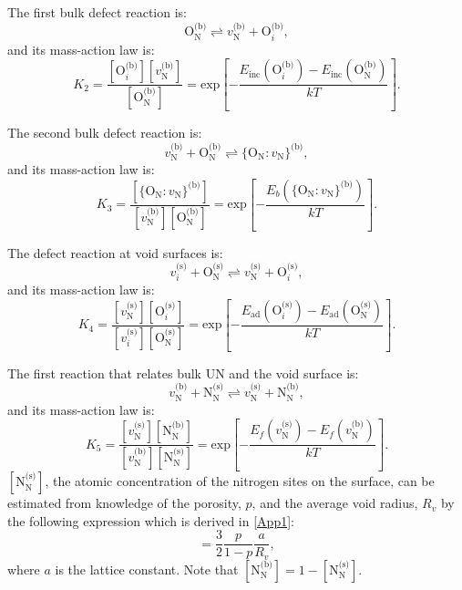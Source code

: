 \documentclass[preprint,12pt,sort&compress]{elsarticle}
\newcommand{\?}{\stackrel{?}{=}}
\begin{document}
The first bulk defect reaction is:
\begin{equation}
\text{O}_\text{N}^\text{(b)} \rightleftharpoons v_\text{N}^\text{(b)} + \text{O}_i^\text{(b)},
\end{equation}
and its mass-action law is:
\begin{equation}
K_2 = \frac{ [ \text{O}_i^\text{(b)} ]  [ v_\text{N}^\text{(b)} ] } { [ \text{O}_\text{N}^\text{(b)} ] } = \text{exp}\! \left[ - \frac{ E_\text{inc}( \text{O}_i^\text{(b)} ) - E_\text{inc}( \text{O}_\text{N}^\text{(b)} ) } { k T } \right].
\end{equation}

The second bulk defect reaction is:
\begin{equation}
v_\text{N}^\text{(b)} + \text{O}_\text{N}^\text{(b)} \rightleftharpoons \{\text{O}_\text{N} \! : \! v_\text{N}\}^\text{(b)},
\end{equation}
and its mass-action law is:
\begin{equation}
K_3 = \frac{ [ \{\text{O}_\text{N} \! : \! v_\text{N}\}^\text{(b)} ] } { [ v_\text{N}^\text{(b)} ] [ \text{O}_\text{N}^\text{(b)} ] } = \text{exp}\! \left[ - \frac{ E_b( \{\text{O}_\text{N} \! : \! v_\text{N}\}^\text{(b)} ) } { k T } \right].
\end{equation}

The defect reaction at void surfaces is:
\begin{equation}
v_i^\text{(s)} + \text{O}_\text{N}^\text{(s)}  \rightleftharpoons  v_\text{N}^\text{(s)} + \text{O}_i^\text{(s)},
\end{equation}
and its mass-action law is:
\begin{equation}
K_4 = \frac{ [ v_\text{N}^\text{(s)} ]  [ \text{O}_i^\text{(s)} ] } { [ v_i^\text{(s)} ] [ \text{O}_\text{N}^\text{(s)} ] } = \text{exp}\! \left[ - \frac{ E_\text{ad}( \text{O}_i^\text{(s)} ) - E_\text{ad}( \text{O}_\text{N}^\text{(s)} ) } { k T } \right].
\end{equation}

The first reaction that relates bulk UN and the void surface is:
\begin{equation}
v_\text{N}^\text{(b)} + \text{N}_\text{N}^\text{(s)}  \rightleftharpoons v_\text{N}^\text{(s)} + \text{N}_\text{N}^\text{(b)},
\end{equation}
and its mass-action law is:
\begin{equation}
K_5 = \frac{ [ v_\text{N}^\text{(s)} ]  [ \text{N}_\text{N}^\text{(b)} ] } { [ v_\text{N}^\text{(b)} ] [ 
\text{N}_\text{N}^\text{(s)} ] } = \text{exp}\! \left[ - \frac{ E_f ( v_\text{N}^\text{(s)} ) - E_f ( v_\text{N}^\text{(b)} ) } { k T } \right].
\label{Eq:VN-VNs}
\end{equation}
$[ \text{N}_\text{N}^\text{(s)} ]$, the atomic concentration of the nitrogen sites on the surface, can be estimated from knowledge of the porosity, $p$, and the average void radius, $R_v$ by the following expression which is derived in \ref{App1}:
\begin{equation}
[ \text{N}_\text{N}^\text{(s)} ] = \frac{3}{2} \frac{p}{1-p} \frac{a}{R_v},
\label{Eq:NNs1}
\end{equation}
where $a$ is the lattice constant. Note that $[ \text{N}_\text{N}^\text{(b)} ] = 1 - [ \text{N}_\text{N}^\text{(s)} ]$. 
\end{document}
